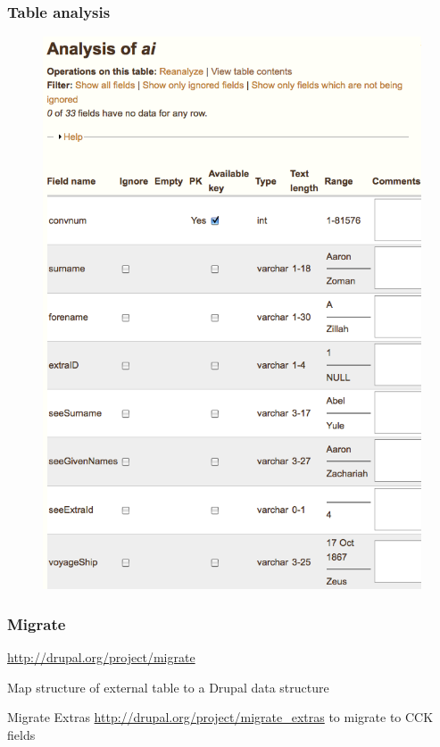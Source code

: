 \documentclass[ignorenonframetext,11pt]{beamer}
\begin{document}
\begin{frame}
\frametitle{Table analysis}
\label{tableanalysis}

\begin{figure}
	\label{analysis}
	\begin{center}
	\includegraphics[keepaspectratio,width=\textwidth, height=.75\textheight]{images/Analysis.png}
	\end{center}
	\end{figure}
	



\end{frame}
		

\begin{frame}
\frametitle{Migrate}
\label{migrate}

\url{http://drupal.org/project/migrate}


Map structure of external table to a Drupal data structure


Migrate Extras \url{http://drupal.org/project/migrate\_extras} to migrate to CCK fields



\end{frame}
		
\end{document}
